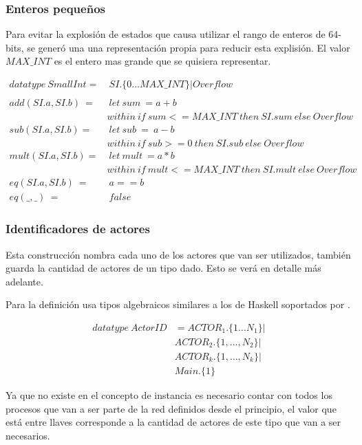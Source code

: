 \subsubsection{Enteros pequeños}

Para evitar la explosión de estados que causa utilizar el rango de enteros de 64-bits, se generó una una representación propia para reducir esta explisión. El valor $MAX\_INT$ es el entero mas grande que se quisiera representar.

\begin{align*}
datatype\ SmallInt =&\ SI.\{0 \ldots MAX\_INT\} | Overflow \\
\\
add(SI.a, SI.b)\ =&\ let\ sum\ = a + b \\
&within\ if\ sum <= MAX\_INT\ then\ SI.sum\ else\ Overflow  \\
%
sub(SI.a, SI.b) =&\ let\ sub\ =\ a - b \\
& within\ if\ sub >= 0\ then\ SI.sub\ else\ Overflow \\
%
mult(SI.a, SI.b) =&\ let\ mult\ = a * b \\
& within\ if\ mult <= MAX\_INT\ then\ SI.mult\ else\ Overflow \\
eq(SI.a, SI.b)\ =&\ a == b \\
eq(\_, \_)\ =&\ false
\end{align*}

\subsubsection{Identificadores de actores}

Esta construcción nombra cada uno de los actores que van ser utilizados, también guarda la cantidad de actores de un tipo dado. Esto se verá en detalle más adelante.

Para la definición usa tipos algebraicos similares a los de Haskell soportados por \CSPm.

\begin{figure}[H]
\begin{align*}
  datatype\ ActorID &= ACTOR_1.\{1 \ldots N_1\} | \\
  & ACTOR_2.\{1, \ldots ,N_2\} | \\
  & ACTOR_k.\{1, \ldots, N_k\} | \\
  & Main.\{1\}
\end{align*}
\end{figure}

Ya que no existe en \CSP el concepto de instancia es necesario contar con todos los procesos que van a ser parte de la red definidos desde el principio, el valor que está entre llaves corresponde a la cantidad de actores de este tipo que van a ser necesarios. 

